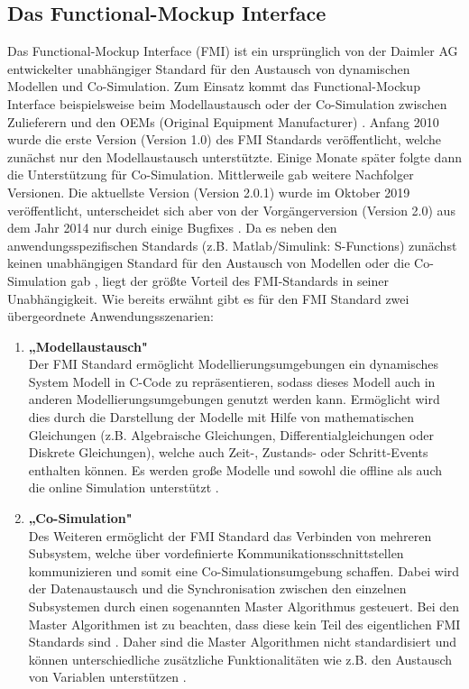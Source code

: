 \subsection{Das Functional-Mockup Interface}\label{sec:DasFMU}
Das Functional-Mockup Interface (FMI) ist ein ursprünglich von der Daimler AG entwickelter unabhängiger Standard für den Austausch von dynamischen Modellen und Co-Simulation. Zum Einsatz kommt das Functional-Mockup Interface beispielsweise beim Modellaustausch oder der Co-Simulation zwischen Zulieferern und den OEMs (Original Equipment Manufacturer) \cite[S.1]{24}.
Anfang 2010 wurde die erste Version (Version 1.0) des FMI Standards veröffentlicht, welche zunächst nur den Modellaustausch unterstützte. Einige Monate später folgte dann die Unterstützung für Co-Simulation. Mittlerweile gab weitere Nachfolger Versionen. Die aktuellste Version (Version 2.0.1) wurde im Oktober 2019 veröffentlicht, unterscheidet sich aber von der Vorgängerversion (Version 2.0) aus dem Jahr 2014 nur durch einige Bugfixes \cite[S.2]{25}.
Da es neben den anwendungsspezifischen Standards (z.B. Matlab/Simulink: S-Functions) zunächst keinen unabhängigen Standard für den Austausch von Modellen oder die Co-Simulation gab \cite[S.1]{24}, liegt der größte Vorteil des FMI-Standards in seiner Unabhängigkeit.
\newline
Wie bereits erwähnt gibt es für den FMI Standard zwei übergeordnete Anwendungsszenarien:
\begin{enumerate}
	\item \textbf{„Modellaustausch"} \cite[S.4]{25} \\
	Der FMI Standard ermöglicht Modellierungsumgebungen ein dynamisches System Modell in C-Code zu repräsentieren, sodass dieses Modell auch in anderen Modellierungsumgebungen genutzt werden kann. Ermöglicht wird dies durch die Darstellung der Modelle mit Hilfe von mathematischen Gleichungen (z.B. Algebraische Gleichungen, Differentialgleichungen oder Diskrete Gleichungen), welche auch Zeit-, Zustands- oder Schritt-Events enthalten können. Es werden große Modelle und sowohl die offline als auch die online Simulation unterstützt \cite[S.4]{25}.
	\item \textbf{„Co-Simulation"} \cite[S.4]{25} \\
	Des Weiteren ermöglicht der FMI Standard das Verbinden von mehreren Subsystem, welche über vordefinierte Kommunikationsschnittstellen kommunizieren und somit eine Co-Simulationsumgebung schaffen. Dabei wird der Datenaustausch und die Synchronisation zwischen den einzelnen Subsystemen durch einen sogenannten Master Algorithmus gesteuert. Bei den Master Algorithmen ist zu beachten, dass diese kein Teil des eigentlichen FMI Standards sind \cite[S.4]{25}. Daher sind die Master Algorithmen nicht standardisiert und können unterschiedliche zusätzliche Funktionalitäten wie z.B. den Austausch von Variablen unterstützen \cite[S.1]{24}.
\end{enumerate}

